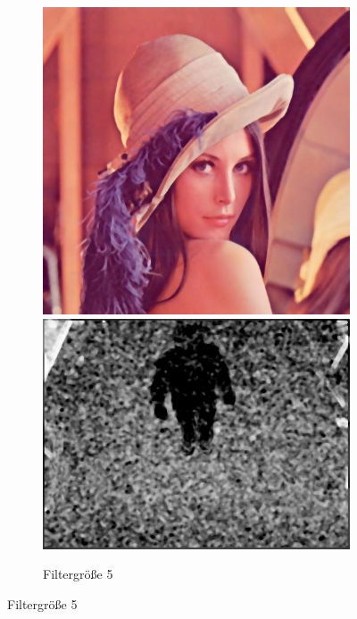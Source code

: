 \begin{figure}
\begin{subfigure}{.49\textwidth}
	\end{subfigure}
	\begin{subfigure}{.49\textwidth}
		\centering
		\includegraphics[width=.99\linewidth]{A1/lena5.jpg}
		\includegraphics[width=.99\linewidth]{A1/rauschen5.jpg}
		\caption{Filtergröße 5}
	\end{subfigure}
\end{figure}